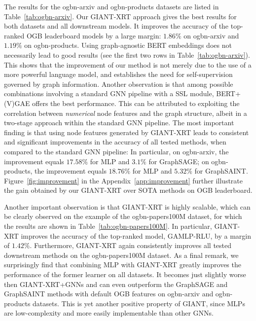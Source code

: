 \documentclass{article} %
\begin{document}
The results for the ogbn-arxiv and ogbn-products datasets are listed in Table~\ref{tab:ogbn-arxiv}. Our GIANT-XRT approach gives the best results for both datasets and all downstream models. It improves the accuracy of the top-ranked OGB leaderboard models by a large margin:  $1.86\%$ on ogbn-arxiv and $1.19\%$ on ogbn-products. Using graph-agnostic BERT embeddings does not necessarily lead to good results (see the first two rows in Table~\ref{tab:ogbn-arxiv}). This shows that the improvement of our method is not merely due to the use of a more powerful language model, and establishes the need for self-supervision governed by graph information.
Another observation is that among possible combinations involving a standard GNN pipeline with a SSL module, BERT+(V)GAE offers the best performance. This can be attributed to exploiting the correlation between \emph{numerical} node features and the graph structure, albeit in a two-stage approach within the standard GNN pipeline. The most important finding is that using node features generated by GIANT-XRT leads to consistent and significant improvements in the accuracy of all tested methods, when compared to the standard GNN pipeline: In particular, on ogbn-arxiv, the improvement equals $17.58\%$ for MLP and $3.1\%$ for GraphSAGE; on ogbn-products, the improvement equals $18.76\%$ for MLP and $5.32\%$ for GraphSAINT. Figure~\ref{fig:improvement} in the Appendix~\ref{app:improvement} further illustrate the gain obtained by our GIANT-XRT over SOTA methods on OGB leaderboard.

Another important observation is that GIANT-XRT is highly scalable, which can be clearly observed on the example of the ogbn-papers100M dataset, for which the results are shown in Table~\ref{tab:ogbn-papers100M}. In particular, GIANT-XRT improves the accuracy of the top-ranked model, GAMLP-RLU, by a margin of $1.42\%$. Furthermore, GIANT-XRT again consistently improves all tested downstream methods on the ogbn-papers100M dataset. As a final remark, we surprisingly find that combining MLP with GIANT-XRT greatly improves the performance of the former learner on all datasets. It becomes just slightly worse then GIANT-XRT+GNNs and can even outperform the GraphSAGE and GraphSAINT methods with default OGB features on ogbn-arxiv and ogbn-products datasets. This is yet another positive property of GIANT, since MLPs are low-complexity and more easily implementable than other GNNs.
\end{document}
